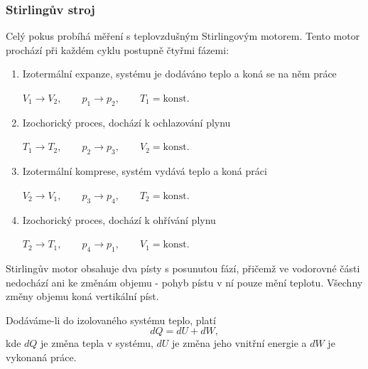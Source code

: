 \documentclass[english]{article}
\begin{document}
\subsubsection{Stirlingův stroj}
	Celý pokus probíhá měření s teplovzdušným Stirlingovým motorem. Tento motor prochází při každém cyklu postupně čtyřmi fázemi:
	\begin{enumerate}
	\item Izotermální expanze, systému je dodáváno teplo a koná se na něm práce
	\begin{center} $V_{1} \rightarrow V_{2},\qquad p_{1} \rightarrow p_{2},\qquad T_{1}=\mathrm{konst}.$ \end{center}
	\item Izochorický proces, dochází k ochlazování plynu
	\begin{center} $T_{1} \rightarrow T_{2},\qquad p_{2} \rightarrow p_{3},\qquad V_{2}=\mathrm{konst}.$ \end{center}
	\item Izotermální komprese, systém vydává teplo a koná práci
	\begin{center} $V_{2} \rightarrow V_{1},\qquad p_{3} \rightarrow p_{4},\qquad T_{2}=\mathrm{konst}.$ \end{center}
	\item Izochorický proces, dochází k ohřívání plynu
	\begin{center} $T_{2} \rightarrow T_{1},\qquad p_{4} \rightarrow p_{1},\qquad V_{1}=\mathrm{konst}.$ \end{center}
	\end{enumerate} 
	
	Stirlingův motor obsahuje dva písty s posunutou fází, přičemž ve vodorovné části nedochází ani ke změnám objemu - pohyb pístu v ní pouze mění teplotu. Všechny změny objemu koná vertikální píst.
	
	Dodáváme-li do izolovaného systému teplo, platí
	\begin{equation}
	dQ = dU +dW,
	\end{equation}
	kde $dQ$ je změna tepla v systému, $dU$ je změna jeho vnitřní energie a $dW$ je vykonaná práce.
	
\end{document}

